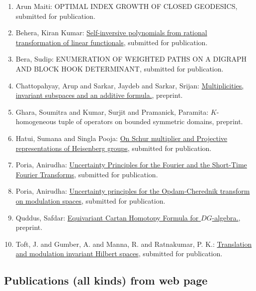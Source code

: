 \begin{enumerate}
\item Arun Maiti: OPTIMAL INDEX GROWTH OF CLOSED GEODESICS, submitted for publication.
\item Behera, Kiran Kumar: \href{https://arxiv.org/abs/1909.12548}{Self-inversive polynomials from rational transformation of linear functionals}, submitted for publication.
\item Bera, Sudip: ENUMERATION OF WEIGHTED PATHS ON A DIGRAPH AND BLOCK HOOK DETERMINANT, submitted for publication.
\item Chattopahyay, Arup and Sarkar, Jaydeb and Sarkar, Srijan: \href{https://arxiv.org/abs/1812.05435}{Multiplicities, invariant subspaces and an additive formula.}, preprint.
\item Ghara, Soumitra and Kumar, Surjit and Pramanick, Paramita: $K$-homogeneous tuple of operators on bounded symmetric domains, preprint.
\item Hatui, Sumana and Singla Pooja: \href{https://arxiv.org/abs/1909.06589}{On Schur multiplier and Projective representations of Heisenberg groups}, submitted for publication.
\item Poria, Anirudha: \href{https://arxiv.org/abs/2004.04184}{Uncertainty Principles for the Fourier and the Short-Time Fourier Transforms}, submitted for publication.
\item Poria, Anirudha: \href{https://arxiv.org/abs/2005.14274}{Uncertainty principles for the Opdam-Cherednik transform on modulation spaces}, submitted for publication.
\item Quddus, Safdar: \href{https://arxiv.org/abs/2002.02192}{Equivariant Cartan Homotopy Formula for $DG$-algebra.}, preprint.
\item Toft, J. and Gumber, A. and Manna, R. and Ratnakumar, P. K.: \href{https://arxiv.org/abs/2004.02430v1}{Translation and modulation invariant Hilbert spaces}, submitted for publication.
\end{enumerate}



\subsection{Publications (all kinds) from web page}

